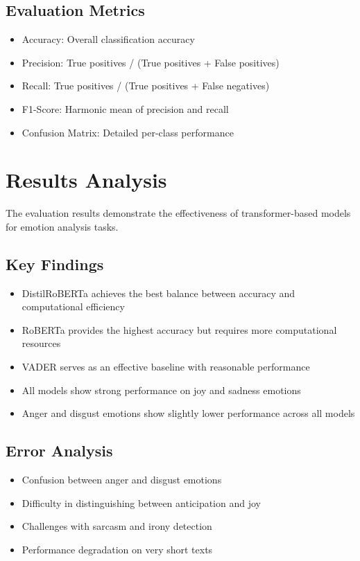 \subsection{Evaluation Metrics}
\begin{itemize}
\item Accuracy: Overall classification accuracy
\item Precision: True positives / (True positives + False positives)
\item Recall: True positives / (True positives + False negatives)
\item F1-Score: Harmonic mean of precision and recall
\item Confusion Matrix: Detailed per-class performance
\end{itemize}


\section{Results Analysis}

The evaluation results demonstrate the effectiveness of transformer-based models for emotion analysis tasks.

\subsection{Key Findings}
\begin{itemize}
\item DistilRoBERTa achieves the best balance between accuracy and computational efficiency
\item RoBERTa provides the highest accuracy but requires more computational resources
\item VADER serves as an effective baseline with reasonable performance
\item All models show strong performance on joy and sadness emotions
\item Anger and disgust emotions show slightly lower performance across all models
\end{itemize}

\subsection{Error Analysis}
\begin{itemize}
\item Confusion between anger and disgust emotions
\item Difficulty in distinguishing between anticipation and joy
\item Challenges with sarcasm and irony detection
\item Performance degradation on very short texts
\end{itemize}

